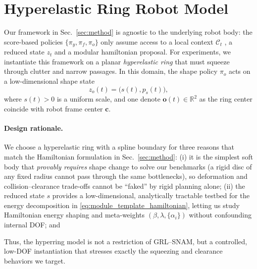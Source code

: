 \documentclass{article} %
\let\vec=\boldsymbol
\begin{document}
\section{Hyperelastic Ring Robot Model}
\label{app:hyperelastic_model}

Our framework in Sec.~\ref{sec:method} is agnostic to the underlying robot body: the score-based policies $\{\pi_y,\pi_f,\pi_o\}$ only assume access to a local context $\mathcal{C}_t$ , a reduced state $z_t$ and a modular hamiltonian proposal. For experiments, we instantiate this framework on a planar \emph{hyperelastic ring} that must squeeze through clutter and narrow passages. In this domain, the shape policy $\pi_o$ acts on a low-dimensional shape state
\[
z_o(t) = \big(s(t), p_s(t)\big),
\]
where $s(t)\!>\!0$ is a uniform scale, and one denote $\mathbf{o}(t)\in\mathbb{R}^2$ as the ring center coincide with robot frame center $\vec{c}$.

\paragraph{Design rationale.}
We choose a hyperelastic ring with a spline boundary for three reasons that match the Hamiltonian formulation in Sec.~\ref{sec:method}:
(i) it is the simplest soft body that \emph{provably requires} shape change to solve our benchmarks (a rigid disc of any fixed radius cannot pass through the same bottlenecks), so deformation and collision–clearance trade-offs cannot be “faked” by rigid planning alone;
(ii) the reduced state $s$ provides a low-dimensional, analytically tractable testbed for the energy decomposition in \cref{eq:module_template_hamiltonian}, letting us study Hamiltonian energy shaping and meta-weights $(\beta,\lambda,\{\alpha_i\})$ without confounding internal DOF; and

Thus, the hyperring model is not a restriction of GRL--SNAM, but a controlled, low-DOF instantiation that stresses exactly the squeezing and clearance behaviors we target.
\end{document}
